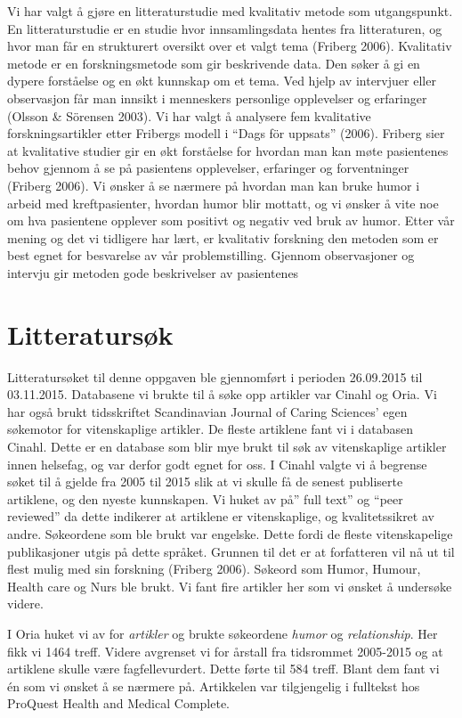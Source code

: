 Vi har valgt å gjøre en litteraturstudie med kvalitativ metode som
utgangspunkt. En litteraturstudie er en studie hvor innsamlingsdata hentes fra
litteraturen, og hvor man får en strukturert oversikt over et valgt tema
(Friberg 2006). Kvalitativ metode er en forskningsmetode som gir beskrivende
data. Den søker å gi en dypere forståelse og en økt kunnskap om et tema. Ved
hjelp av intervjuer eller observasjon får man innsikt i menneskers personlige
opplevelser og erfaringer (Olsson \&{} Sörensen 2003). Vi har valgt å analysere
fem kvalitative forskningsartikler etter Fribergs modell i “Dags för uppsats”
(2006). Friberg sier at kvalitative studier gir en økt forståelse for hvordan
man kan møte pasientenes behov gjennom å se på pasientens opplevelser,
erfaringer og forventninger (Friberg 2006).  Vi ønsker å se nærmere på hvordan
man kan bruke humor i arbeid med kreftpasienter, hvordan humor blir mottatt, og
vi ønsker å vite noe om hva pasientene opplever som positivt og negativ ved
bruk av humor. Etter vår mening og det vi tidligere har lært, er kvalitativ
forskning den metoden som er best egnet for besvarelse av vår problemstilling.
Gjennom observasjoner og intervju gir metoden gode beskrivelser av pasientenes

\section{Litteratursøk}

Litteratursøket til denne oppgaven ble gjennomført i perioden 26.09.2015 til
03.11.2015. Databasene vi brukte til å søke opp artikler var Cinahl og Oria. Vi
har også brukt tidsskriftet Scandinavian Journal of Caring Sciences’ egen
søkemotor for vitenskaplige artikler. De fleste artiklene fant vi i databasen
Cinahl. Dette er en database som blir mye brukt til søk av vitenskaplige
artikler innen helsefag, og var derfor godt egnet for oss.  I Cinahl valgte vi
å begrense søket til å gjelde fra 2005 til 2015 slik at vi skulle få de senest
publiserte artiklene, og den nyeste kunnskapen. Vi huket av på” full text” og
“peer reviewed” da dette indikerer at artiklene er vitenskaplige, og
kvalitetssikret av andre. Søkeordene som ble brukt var engelske. Dette fordi de
fleste vitenskapelige publikasjoner utgis på dette språket. Grunnen til det er
at forfatteren vil nå ut til flest mulig med sin forskning (Friberg 2006).
Søkeord som Humor, Humour, Health care og Nurs ble brukt. Vi fant fire artikler
her som vi ønsket å undersøke videre.

I Oria huket vi av for \textit{artikler} og brukte søkeordene \textit{humor} og
\textit{relationship}. Her fikk vi 1464 treff. Videre avgrenset vi for årstall
fra tidsrommet 2005-2015 og at artiklene skulle være fagfellevurdert.  Dette
førte til 584 treff. Blant dem fant vi én som vi ønsket å se nærmere på.
Artikkelen var tilgjengelig i fulltekst hos ProQuest Health and Medical
Complete.

